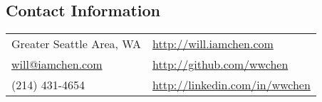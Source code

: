 \documentclass[margin,line]{res}
\begin{document}

\begin{resume}
\section{\sc Contact Information}
\begin{tabular}{@{}p{2.5in}p{4in}}
Greater Seattle Area, WA                           & \href{http://will.iamchen.com}{http://will.iamchen.com} \\
\href{mailto:will@iamchen.com}{will@iamchen.com} & \href{http://github.com/wwchen}{http://github.com/wwchen} \\ (214) 431-4654                                     & \href{http://linkedin.com/in/wwchen}{http://linkedin.com/in/wwchen} \\
\end{tabular}

%
%

\end{resume}
\end{document}
